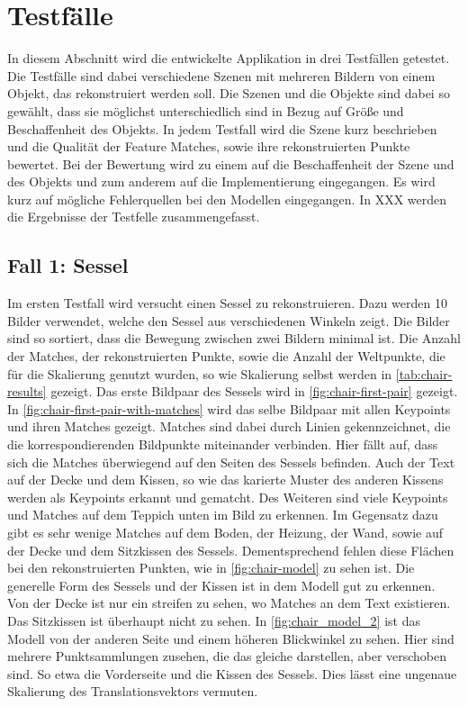
\chapter{Testfälle}

In diesem Abschnitt wird die entwickelte Applikation in drei Testfällen getestet.
Die Testfälle sind dabei verschiedene Szenen mit mehreren Bildern von einem Objekt, das rekonstruiert werden soll.
Die Szenen und die Objekte sind dabei so gewählt, dass sie möglichst unterschiedlich sind in Bezug auf Größe und Beschaffenheit des Objekts.
In jedem Testfall wird die Szene kurz beschrieben und die Qualität der Feature Matches, sowie ihre rekonstruierten Punkte bewertet.
Bei der Bewertung wird zu einem auf die Beschaffenheit der Szene und des Objekts und zum anderem auf die Implementierung eingegangen.
Es wird kurz auf mögliche Fehlerquellen bei den Modellen eingegangen.
In XXX werden die Ergebnisse der Testfelle zusammengefasst.

\section{Fall 1: Sessel}
Im ersten Testfall wird versucht einen Sessel zu rekonstruieren.
Dazu werden 10 Bilder verwendet, welche den Sessel aus verschiedenen Winkeln zeigt.
Die Bilder sind so sortiert, dass die Bewegung zwischen zwei Bildern minimal ist.
Die Anzahl der Matches, der rekonstruierten Punkte, sowie die Anzahl der Weltpunkte, die für die Skalierung genutzt wurden, so wie Skalierung selbst werden in \cref{tab:chair-results} gezeigt. %
Das erste Bildpaar des Sessels wird in \cref{fig:chair-first-pair} gezeigt.
In \cref{fig:chair-first-pair-with-matches} wird das selbe Bildpaar mit allen Keypoints und ihren Matches gezeigt.
Matches sind dabei durch Linien gekennzeichnet, die die korrespondierenden Bildpunkte miteinander verbinden.
Hier fällt auf, dass sich die Matches überwiegend auf den Seiten des Sessels befinden.
Auch der Text auf der Decke und dem Kissen, so wie das karierte Muster des anderen Kissens werden als Keypoints erkannt und gematcht. %
Des Weiteren sind viele Keypoints und Matches auf dem Teppich unten im Bild zu erkennen.
Im Gegensatz dazu gibt es sehr wenige Matches auf dem Boden, der Heizung, der Wand, sowie auf der Decke und dem Sitzkissen des Sessels.
Dementsprechend fehlen diese Flächen bei den rekonstruierten Punkten, wie in \cref{fig:chair-model} zu sehen ist.  
Die generelle Form des Sessels und der Kissen ist in dem Modell gut zu erkennen.
Von der Decke ist nur ein streifen zu sehen, wo Matches an dem Text existieren.  
Das Sitzkissen ist überhaupt nicht zu sehen.
In \cref{fig:chair_model_2} ist das Modell von der anderen Seite und einem höheren Blickwinkel zu sehen.
Hier sind mehrere Punktsammlungen zusehen, die das gleiche darstellen, aber verschoben sind.
So etwa die Vorderseite und die Kissen des Sessels.
Dies lässt eine ungenaue Skalierung des Translationsvektors vermuten.

